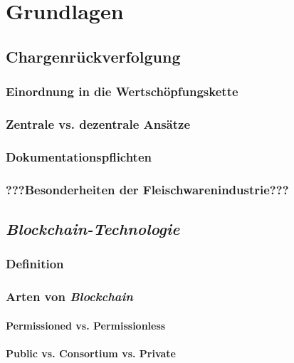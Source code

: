 \section{Grundlagen}

\subsection{Chargenrückverfolgung}

\subsubsection{Einordnung in die Wertschöpfungskette}

\subsubsection{Zentrale vs. dezentrale Ansätze}

\subsubsection{Dokumentationspflichten}

\subsubsection{???Besonderheiten der Fleischwarenindustrie???}


\subsection{\textit{Blockchain-Technologie}}

\subsubsection{Definition}

\subsubsection{Arten von \textit{Blockchain}}

\paragraph{Permissioned vs. Permissionless}

\paragraph{Public vs. Consortium vs. Private}


